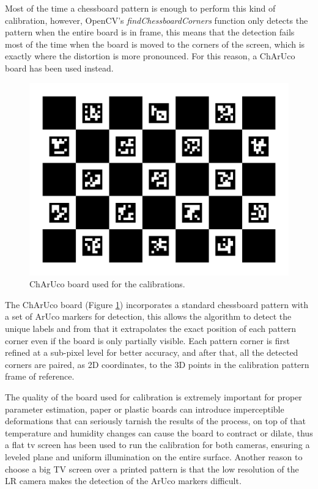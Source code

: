 Most of the time a chessboard pattern is enough to perform this kind of calibration, however, OpenCV's \emph{findChessboardCorners} function only detects the pattern when the entire board is in frame, this means that the detection fails most of the time when the board is moved to the corners of the screen, which is exactly where the distortion is more pronounced. For this reason, a ChArUco board has been used instead.

\begin{figure}[h]
  \centering
  \includegraphics[scale=0.15]{figures/charucoboard.png}
  \caption{ChArUco board used for the calibrations.}
  \label{img:ch_board}
\end{figure}

The ChArUco board (Figure \ref{img:ch_board}) incorporates a standard chessboard pattern with a set of ArUco markers for detection, this allows the algorithm to detect the unique labels and from that it extrapolates the exact position of each pattern corner even if the board is only partially visible. Each pattern corner is first refined at a sub-pixel level for better accuracy, and after that, all the detected corners are paired, as 2D coordinates, to the 3D points in the calibration pattern frame of reference.

The quality of the board used for calibration is extremely important for proper parameter estimation, paper or plastic boards can introduce imperceptible deformations that can seriously tarnish the results of the process, on top of that temperature and humidity changes can cause the board to contract or dilate, thus a flat tv screen has been used to run the calibration for both cameras, ensuring a leveled plane and uniform illumination on the entire surface. Another reason to choose a big TV screen over a printed pattern is that the low resolution of the LR camera makes the detection of the ArUco markers difficult.

